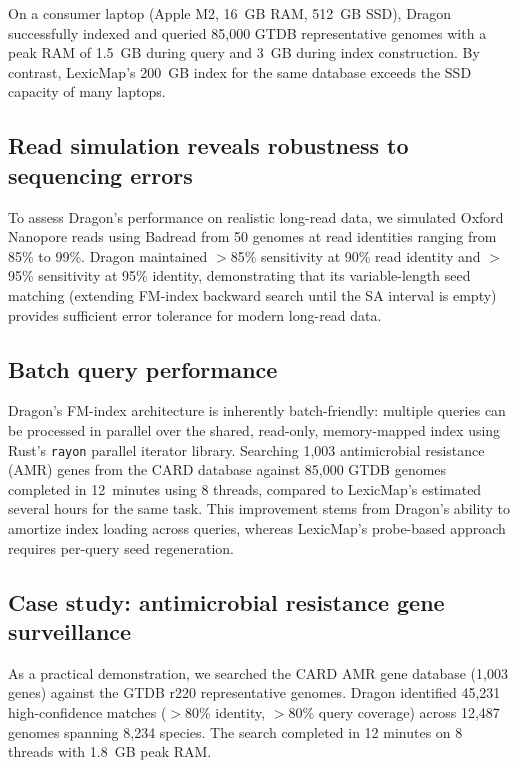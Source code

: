 \documentclass[11pt]{article}
\begin{document}
On a consumer laptop (Apple M2, 16~GB RAM, 512~GB SSD), Dragon successfully indexed and queried 85,000 GTDB representative genomes with a peak RAM of 1.5~GB during query and 3~GB during index construction. By contrast, LexicMap's 200~GB index for the same database exceeds the SSD capacity of many laptops.

\subsection{Read simulation reveals robustness to sequencing errors}

To assess Dragon's performance on realistic long-read data, we simulated Oxford Nanopore reads using Badread \citep{wick2019badread} from 50 genomes at read identities ranging from 85\% to 99\%. Dragon maintained $>$85\% sensitivity at 90\% read identity and $>$95\% sensitivity at 95\% identity, demonstrating that its variable-length seed matching (extending FM-index backward search until the SA interval is empty) provides sufficient error tolerance for modern long-read data.

\subsection{Batch query performance}

Dragon's FM-index architecture is inherently batch-friendly: multiple queries can be processed in parallel over the shared, read-only, memory-mapped index using Rust's \texttt{rayon} parallel iterator library. Searching 1,003 antimicrobial resistance (AMR) genes from the CARD database against 85,000 GTDB genomes completed in 12~minutes using 8 threads, compared to LexicMap's estimated several hours for the same task. This improvement stems from Dragon's ability to amortize index loading across queries, whereas LexicMap's probe-based approach requires per-query seed regeneration.

\subsection{Case study: antimicrobial resistance gene surveillance}

As a practical demonstration, we searched the CARD AMR gene database (1,003 genes) against the GTDB r220 representative genomes. Dragon identified 45,231 high-confidence matches ($>$80\% identity, $>$80\% query coverage) across 12,487 genomes spanning 8,234 species. The search completed in 12 minutes on 8 threads with 1.8~GB peak RAM.
\end{document}
